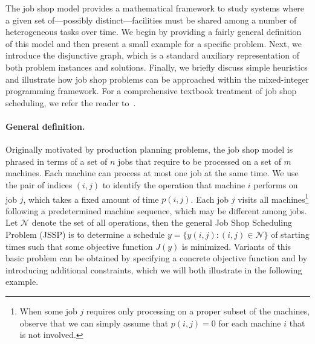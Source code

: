 \documentclass[a4paper]{report}
\theoremstyle{definition}
\theoremstyle{plain}
\begin{document}
The job shop model provides a mathematical framework to study systems where a
given set of---possibly distinct---facilities must be shared among a number of
heterogeneous tasks over time.
%
We begin by providing a fairly general definition of this model and then present a
small example for a specific problem.
%
Next, we introduce the disjunctive graph, which is a standard auxiliary
representation of both problem instances and solutions.
%
Finally, we briefly discuss simple heuristics and illustrate how job shop
problems can be approached within the mixed-integer programming framework.
%
For a comprehensive textbook treatment of job shop scheduling, we refer the
reader to~\cite[Chapter 7]{pinedoSchedulingTheoryAlgorithms2016}.

\paragraph{General definition.}
Originally motivated by production planning problems, the job shop model is
phrased in terms of a set of $n$ jobs that require to be processed on a set of
$m$ machines. Each machine can process at most one job at the same time.
%
We use the pair of indices $(i,j)$ to identify the operation that machine $i$
performs on job $j$, which takes a fixed amount of time $p(i,j)$.
%
Each job $j$ visits all machines\footnote{When some job $j$ requires only
  processing on a proper subset of the machines, observe that we can simply
  assume that $p(i,j) = 0$ for each machine $i$ that is not involved.} following
a predetermined machine sequence, which may be different among jobs.
%
Let $\mathcal{N}$ denote the set of all operations, then the general Job Shop Scheduling
Problem (JSSP) is to determine a schedule $y = \{ y(i,j) : (i,j) \in \mathcal{N} \}$ of
starting times such that some objective function $J(y)$ is minimized.
%
Variants of this basic problem can be obtained by specifying a concrete
objective function and by introducing additional constraints, which we will both
illustrate in the following example.
\end{document}
